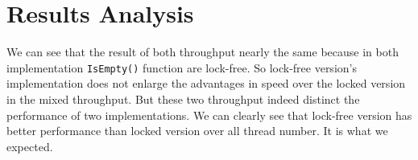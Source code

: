 \documentclass[a4paper]{report}
\begin{document}
\section*{Results Analysis}
We can see that the result of both throughput nearly the same because in both implementation \lstinline{IsEmpty()} function are lock-free. So lock-free version's implementation does not enlarge the advantages in speed over the locked version in the mixed throughput. But these two throughput indeed distinct the performance of two implementations. We can clearly see that lock-free version has better performance than locked version over all thread number. It is what we expected.
\end{document}
